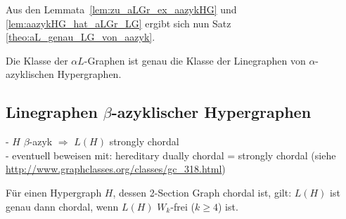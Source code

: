 Aus den Lemmata~\ref{lem:zu_aLGr_ex_aazykHG} und \ref{lem:aazykHG_hat_aLGr_LG} ergibt sich nun Satz \ref{theo:aL_genau_LG_von_aazyk}.

\begin{Theorem}\label{theo:aL_genau_LG_von_aazyk}
    Die Klasse der $\alpha L$-Graphen ist genau die Klasse der Linegraphen von $\alpha$-azyklischen Hypergraphen.
\end{Theorem}

\subsection{Linegraphen $\beta$-azyklischer Hypergraphen}

- $H$ $\beta$-azyk $\Rightarrow$ $L(H)$ strongly chordal \\
- eventuell beweisen mit:  hereditary dually chordal = strongly chordal (siehe \url{http://www.graphclasses.org/classes/gc_318.html})


\begin{Lemma}\label{lem:chordalWkFrei}
    Für einen Hypergraph $H$, dessen 2-Section Graph chordal ist, gilt: $L(H)$ ist genau dann chordal, wenn $L(H)$ $W_k$-frei ($k\geq4$) ist.
\end{Lemma}

